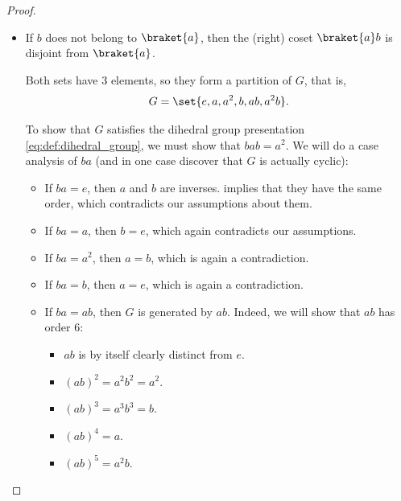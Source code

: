 \begin{proof}
\begin{itemize}
    Since \( b^2 = e \), we have \( (ca)^2 = e \). But \( a^3 = e \). Thus, \( c^2 a^2 = a^3 \), i.e. \( a = c^2 \).

     implies that the order of \( c \) is either \( 2 \), \( 3 \) or \( 6 \). It cannot be \( 2 \) because then \( a \) would equal \( e \). It cannot be \( 3 \) because then \( a^3 = ca = b \) would equal \( e \).

    It remains for the order of \( c \) to be \( 6 \). Then \( c \) generates \( G \), and \cref{thm:cyclic_monoid_classification/finite_group} implies that \( G \) is isomorphic to \( C_6 \).

    \item If \( b \) does not belong to \( \braket{ a } \), then the (right) coset \( \braket{ a } b \) is disjoint from \( \braket{ a } \).

    Both sets have \( 3 \) elements, so they form a partition of \( G \), that is,
    \begin{equation*}
      G = \set{ e, a, a^2, b, ab, a^2 b }.
    \end{equation*}

    To show that \( G \) satisfies the dihedral group presentation \eqref{eq:def:dihedral_group}, we must show that \( bab = a^2 \). We will do a case analysis of \( ba \) (and in one case discover that \( G \) is actually cyclic):
    \begin{itemize}
      \item If \( ba = e \), then \( a \) and \( b \) are inverses.  implies that they have the same order, which contradicts our assumptions about them.

      \item If \( ba = a \), then \( b = e \), which again contradicts our assumptions.

      \item If \( ba = a^2 \), then \( a = b \), which is again a contradiction.

      \item If \( ba = b \), then \( a = e \), which is again a contradiction.

      \item If \( ba = ab \), then \( G \) is generated by \( ab \). Indeed, we will show that \( ab \) has order \( 6 \):
      \begin{itemize}
        \item \( ab \) is by itself clearly distinct from \( e \).
        \item \( (ab)^2 = a^2 b^2 = a^2 \).
        \item \( (ab)^3 = a^3 b^3 = b \).
        \item \( (ab)^4 = a \).
        \item \( (ab)^5 = a^2 b \).
      \end{itemize}


\end{itemize}
\end{itemize}
\end{proof}
